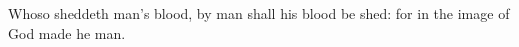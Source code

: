 \documentclass[MAIN]{subfiles}
\begin{document}
Whoso sheddeth man's blood, by man shall his blood be shed: for in the image of God made he man.
\end{document}
